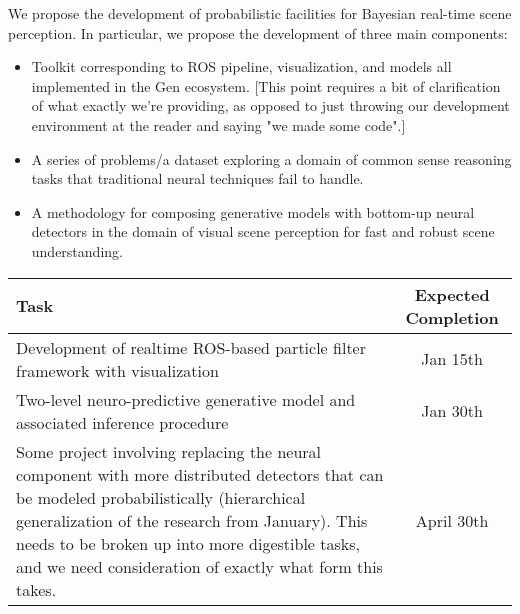 We propose the development of probabilistic facilities for Bayesian real-time
scene perception. In particular, we propose the development of three main components:
\begin{itemize}
  \item Toolkit corresponding to ROS pipeline, visualization, and models all
    implemented in the Gen ecosystem. [This point requires a bit of
    clarification of what exactly we're providing, as opposed to just throwing
    our development environment at the reader and saying "we made some code".]
  \item A series of problems/a dataset exploring a domain of common sense
    reasoning tasks that traditional neural techniques fail to handle.
  \item A methodology for composing generative models with bottom-up neural
    detectors in the domain of visual scene perception for fast and robust
    scene understanding.
\end{itemize}

\begin{table}
  \begin{tabularx}{\textwidth}{|X|c|}
    \hline
    \textbf{Task} & \textbf{Expected Completion} \\
    \hline
    Development of realtime ROS-based particle filter framework with visualization & Jan 15th \\
    \hline
    Two-level neuro-predictive generative model and associated inference procedure & Jan 30th \\
    \hline
    Some project involving replacing the neural component with more distributed detectors that can be modeled probabilistically (hierarchical generalization of the research from January). This needs to be broken up into more digestible tasks, and we need consideration of exactly what form this takes. & April 30th \\
    \hline
  \end{tabularx}
\end{table}
